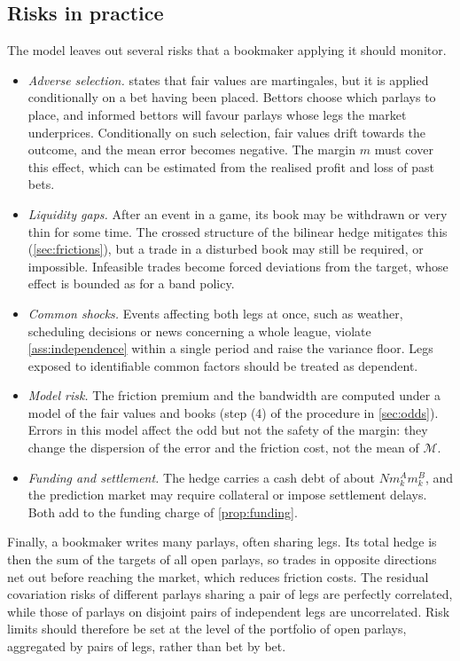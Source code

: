 \documentclass[11pt,a4paper]{article}
\theoremstyle{plain}
\theoremstyle{definition}
\theoremstyle{remark}
\newcommand{\1}{\mathbf{1}}
\begin{document}
\subsection{Risks in practice}

The model leaves out several risks that a bookmaker applying it should monitor.
\begin{itemize}
  \item \emph{Adverse selection.}  states that fair values are martingales, but it is applied conditionally on a bet having been placed. Bettors choose which parlays to place, and informed bettors will favour parlays whose legs the market underprices. Conditionally on such selection, fair values drift towards the outcome, and the mean error becomes negative. The margin $m$ must cover this effect, which can be estimated from the realised profit and loss of past bets.
  \item \emph{Liquidity gaps.} After an event in a game, its book may be withdrawn or very thin for some time. The crossed structure of the bilinear hedge mitigates this (\cref{sec:frictions}), but a trade in a disturbed book may still be required, or impossible. Infeasible trades become forced deviations from the target, whose effect is bounded as for a band policy.
  \item \emph{Common shocks.} Events affecting both legs at once, such as weather, scheduling decisions or news concerning a whole league, violate \cref{ass:independence} within a single period and raise the variance floor. Legs exposed to identifiable common factors should be treated as dependent.
  \item \emph{Model risk.} The friction premium and the bandwidth are computed under a model of the fair values and books (step (4) of the procedure in \cref{sec:odds}). Errors in this model affect the odd but not the safety of the margin: they change the dispersion of the error and the friction cost, not the mean of $\mathcal{M}$.
  \item \emph{Funding and settlement.} The hedge carries a cash debt of about $Nm^A_km^B_k$, and the prediction market may require collateral or impose settlement delays. Both add to the funding charge of \cref{prop:funding}.
\end{itemize}

Finally, a bookmaker writes many parlays, often sharing legs. Its total hedge is then the sum of the targets of all open parlays, so trades in opposite directions net out before reaching the market, which reduces friction costs. The residual covariation risks of different parlays sharing a pair of legs are perfectly correlated, while those of parlays on disjoint pairs of independent legs are uncorrelated. Risk limits should therefore be set at the level of the portfolio of open parlays, aggregated by pairs of legs, rather than bet by bet.
\end{document}
